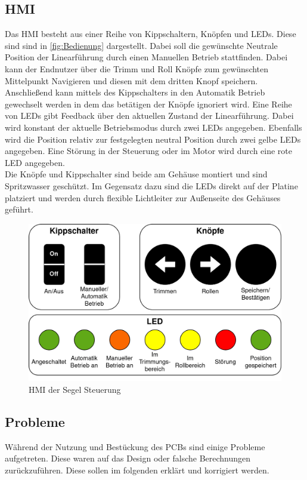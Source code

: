 \subsection{\ac{HMI}}
Das HMI besteht aus einer Reihe von Kippschaltern, Knöpfen und LEDs. Diese sind sind in \autoref{fig:Bedienung} dargestellt. Dabei soll die gewünschte Neutrale Position der Linearführung durch einen Manuellen Betrieb stattfinden. Dabei kann der Endnutzer über die Trimm und Roll Knöpfe zum gewünschten Mittelpunkt Navigieren und diesen mit dem dritten Knopf speichern. Anschließend kann mittels des Kippschalters in den Automatik Betrieb gewechselt werden in dem das betätigen der Knöpfe ignoriert wird.
Eine Reihe von LEDs gibt Feedback über den aktuellen Zustand der Linearführung. Dabei wird konstant der aktuelle Betriebsmodus durch zwei LEDs angegeben. Ebenfalls wird die Position relativ zur festgelegten neutral Position durch zwei gelbe LEDs angegeben. Eine Störung in der Steuerung oder im Motor wird durch eine rote LED angegeben.\\
Die Knöpfe und Kippschalter sind beide am Gehäuse montiert und sind Spritzwasser geschützt. Im Gegensatz dazu sind die LEDs direkt auf der Platine platziert und werden durch flexible Lichtleiter zur Außenseite des Gehäuses geführt.
\begin{figure}[H]
	\centering
	\includegraphics[width=1.0\textwidth]{images/Hardware/Bedienung.drawio.png}
	\caption{HMI der Segel Steuerung}
	\label{fig:Bedienung}
\end{figure}

\subsection{Probleme}
Während der Nutzung und Bestückung des \ac{PCB}s sind einige Probleme aufgetreten. Diese waren auf das Design oder falsche Berechnungen zurückzuführen. Diese sollen im folgenden erklärt und korrigiert werden.
